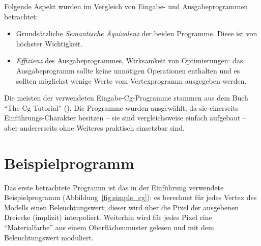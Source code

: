 \documentclass[twoside,a4paper,fleqn,12pt]{book}
\begin{document}
Folgende Aspekt wurden im Vergleich von Eingabe- und Ausgabeprogrammen betrachtet:
\begin{itemize}
\item Grundsätzliche \emph{Semantische Äquivalenz} der beiden Programme. Diese ist von höchster Wichtigkeit.
\item \emph{Effizienz} des Ausgabeprogrammes, Wirksamkeit von Optimierungen: das Ausgabeprogramm sollte keine unnötigen Operationen enthalten und
es sollten möglichst wenige Werte vom Vertexprogramm ausgegeben werden.
\end{itemize}

Die meisten der verwendeten Eingabe-Cg-Programme stammen aus dem Buch ``The Cg Tutorial'' (\cite{cg_tutorial}).
Die Programme wurden ausgewählt, da sie einerseits Einführungs-Charakter besitzen -- sie sind vergleichsweise einfach aufgebaut --
aber andererseits ohne Weiteres praktisch einsetzbar sind.



\section{Beispielprogramm}

Das erste betrachtete Programm ist das in der Einführung verwendete Beispielprogramm (Abbildung~\ref{fig:simple_cg}):
es berechnet für jedes Vertex des Modells einen Beleuchtungswert; dieser wird über die Pixel der ausgebenen
Dreiecke (implizit) interpoliert. Weiterhin wird für jedes Pixel eine "`Materialfarbe"' aus einem Oberflächenmuster gelesen und
mit dem Beleuchtungswert moduliert.


{}

{}

{}
\end{document}
